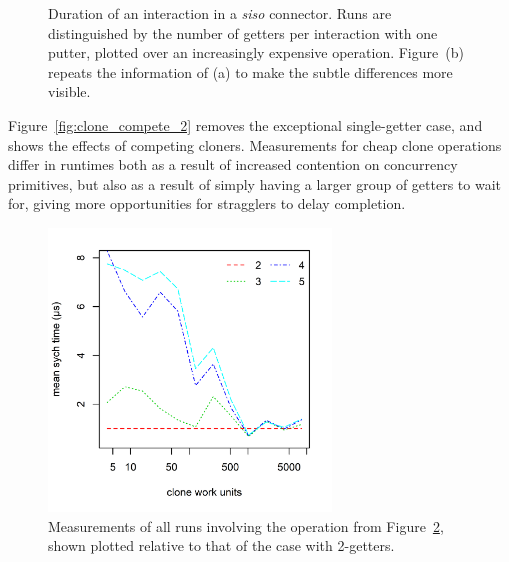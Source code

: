 \begin{figure}
{\begin{subfigure}[b]{0.63\textwidth}
			\caption{}
			\label{fig:clone_compete_1}
		\end{subfigure}%
	}
	\caption[Duration of interaction in siso connector with clonable data.]{Duration of an interaction in a \textit{siso} connector. Runs are distinguished by the number of getters per interaction with one putter, plotted over an increasingly expensive  operation. Figure~(b) repeats the information of (a) to make the subtle differences more visible.}
	\label{fig:clone_compete}
\end{figure}


Figure~\ref{fig:clone_compete_2} removes the exceptional single-getter case, and shows the effects of competing cloners. Measurements for cheap clone operations differ in runtimes both as a result of increased contention on concurrency primitives, but also as a result of simply having a larger group of getters to wait for, giving more opportunities for stragglers to delay completion. 

\begin{figure}
	\centering
	\includegraphics[width=0.67\textwidth]{experiments/clone_compete_2.png}
	\caption[Duration of interaction in siso connector with clonable data plotted relative to the speed of the 2-getter case.]{Measurements of all runs involving the  operation from Figure~\ref{fig:clone_compete}, shown plotted relative to that of the case with 2-getters.}
	\label{fig:clone_compete_3}
\end{figure}

